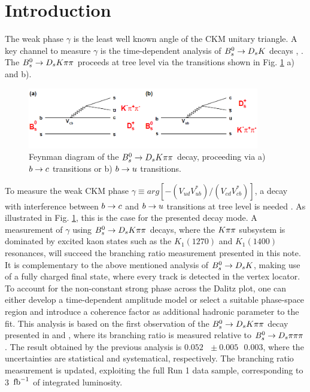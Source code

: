 
\section{Introduction}
\label{sec:Introduction}

The weak phase $\gamma$ is the least well known angle of the CKM unitary triangle. 
A key channel to measure $\gamma$ is the time-dependent analysis of ${{B}^0_{s}}\rightarrow{\ensuremath{{D}_{s}}}{\ensuremath{K}}$ decays \cite{Fleischer:2003yb}, \cite{DeBruyn:2012jp}. \newline
The ${{B}^0_{s}}\rightarrow{\ensuremath{{D}_{s}}}{\ensuremath{K}}{\ensuremath{\pi}}{\ensuremath{\pi}}$ proceeds at tree level via the transitions shown in Fig. \ref{fig: BsFeynman} a) and b). 

\begin{figure}[h]
\includegraphics[height=6.cm,width=0.90\textwidth]{figs/FeynmannGraphs.png}
\caption{Feynman diagram of the ${{B}^0_{s}}\rightarrow{\ensuremath{{D}_{s}}}{\ensuremath{K}}{\ensuremath{\pi}}{\ensuremath{\pi}}$ decay, proceeding via a) ${b}\rightarrow{\ensuremath{c}}$ transitions or b) ${b}\rightarrow{\ensuremath{u}}$ transitions.}
\label{fig: BsFeynman}
\end{figure}

To measure the weak CKM phase $\gamma \equiv arg[-(V_{ud}V_{ub}^{*})/(V_{cd}V_{cb}^{*})]$, a decay with interference between ${b}\rightarrow{\ensuremath{c}}$ and ${b}\rightarrow{\ensuremath{u}}$ transitions at tree level is needed \cite{Fleischer:2003yb}.
As illustrated in Fig. \ref{fig: BsFeynman}, this is the case for the presented decay mode.  
A measurement of $\gamma$ using ${{B}^0_{s}}\rightarrow{\ensuremath{{D}_{s}}}{\ensuremath{K}}\pi\pi$ decays, where the ${K}{\pi}{\pi}$ subsystem 
is dominated by excited kaon states such as the $K_{1}(1270)$ and $K_{1}(1400)$ resonances, will succeed the branching ratio measurement presented in this note.
It is complementary to the above mentioned analysis of ${{B}^0_{s}}\rightarrow{\ensuremath{{D}_{s}}}{\ensuremath{K}}$, making use of a fully charged final state, where every track is detected in the vertex locator. 
To account for the non-constant strong phase across the Dalitz plot, 
one can either develop a time-dependent amplitude model 
or select a suitable phase-space region and introduce a coherence factor as additional hadronic parameter to the fit. \newline
This analysis is based on the first observation of the ${{B}^0_{s}}\rightarrow{\ensuremath{{D}_{s}}}{\ensuremath{K}}{\ensuremath{\pi}}{\ensuremath{\pi}}$ decay presented in \cite{Blusk:1471393} and \cite{Blusk:2012it}, where its branching ratio is measured relative to ${{B}^0_{s}}\rightarrow{\ensuremath{{D}_{s}}}{\ensuremath{\pi}}{\ensuremath{\pi}}{\ensuremath{\pi}}$.
The result obtained by the previous analysis is $0.052\mbox{ }\pm 0.005\mbox{ } 0.003$, where the uncertainties are statistical and systematical, respectively.  
The branching ratio measurement is updated, exploiting the full Run 1 data sample, corresponding to 3 $\mbox{\,fb}^{-1}$ of integrated luminosity.         
